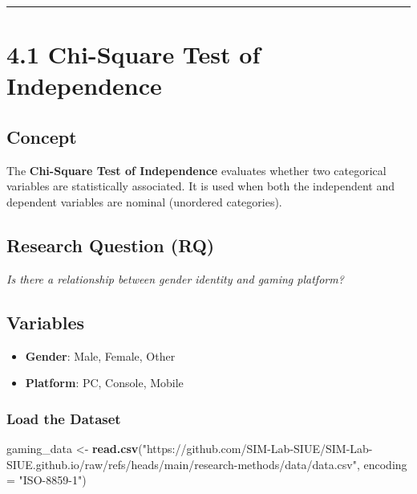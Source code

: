 \documentclass[
]{book}
\newenvironment{Shaded}{\begin{snugshade}}{\end{snugshade}}
\newcommand{\AttributeTok}[1]{\textcolor[rgb]{0.13,0.29,0.53}{#1}}
\newcommand{\FunctionTok}[1]{\textcolor[rgb]{0.13,0.29,0.53}{\textbf{#1}}}
\newcommand{\NormalTok}[1]{#1}
\newcommand{\OtherTok}[1]{\textcolor[rgb]{0.56,0.35,0.01}{#1}}
\newcommand{\StringTok}[1]{\textcolor[rgb]{0.31,0.60,0.02}{#1}}
\providecommand{\tightlist}{%
  \setlength{\itemsep}{0pt}\setlength{\parskip}{0pt}}
\begin{document}
\begin{center}\rule{0.5\linewidth}{0.5pt}\end{center}

\section{4.1 Chi-Square Test of Independence}\label{chi-square-test-of-independence}

\subsection{Concept}\label{concept}

The \textbf{Chi-Square Test of Independence} evaluates whether two categorical variables are statistically associated. It is used when both the independent and dependent variables are nominal (unordered categories).

\subsection{Research Question (RQ)}\label{research-question-rq}

\emph{Is there a relationship between gender identity and gaming platform?}

\subsection{Variables}\label{variables-1}

\begin{itemize}
\tightlist
\item
  \textbf{Gender}: Male, Female, Other
\item
  \textbf{Platform}: PC, Console, Mobile
\end{itemize}

\subsubsection*{Load the Dataset}\label{load-the-dataset-1}

\begin{Shaded}
\begin{Highlighting}[]
\NormalTok{gaming\_data }\OtherTok{\textless{}{-}} \FunctionTok{read.csv}\NormalTok{(}\StringTok{"https://github.com/SIM{-}Lab{-}SIUE/SIM{-}Lab{-}SIUE.github.io/raw/refs/heads/main/research{-}methods/data/data.csv"}\NormalTok{, }\AttributeTok{encoding =} \StringTok{"ISO{-}8859{-}1"}\NormalTok{)}
\end{Highlighting}
\end{Shaded}
\end{document}
